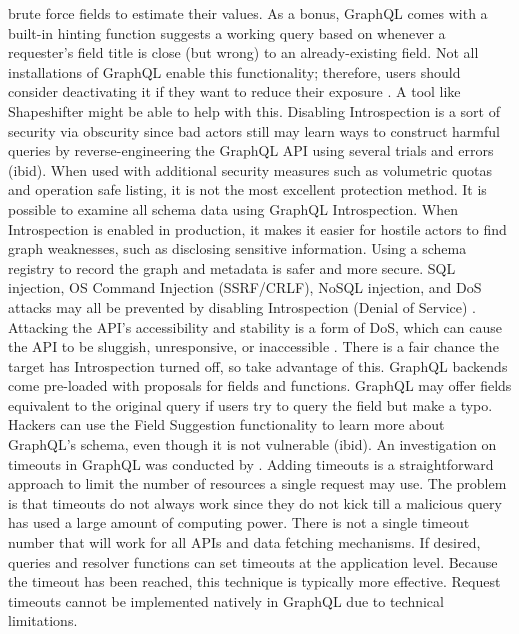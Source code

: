 brute force fields to estimate their values. As a bonus, GraphQL comes with a
built-in hinting function suggests a working query based on whenever a
requester's field title is close (but wrong) to an already-existing field. Not
all installations of GraphQL enable this functionality; therefore, users should
consider deactivating it if they want to reduce their exposure
\citep{kouraiSecureOffloadingLegacy2016}. A tool like Shapeshifter might be able
to help with this. Disabling Introspection is a sort of security via obscurity
since bad actors still may learn ways to construct harmful queries by
reverse-engineering the GraphQL API using several trials and errors (ibid). When
used with additional security measures such as volumetric quotas and operation
safe listing, it is not the most excellent protection method. It is possible to
examine all schema data using GraphQL Introspection. When Introspection is
enabled in production, it makes it easier for hostile actors to find graph
weaknesses, such as disclosing sensitive information. Using a schema registry to
record the graph and metadata is safer and more secure. SQL injection, OS
Command Injection (SSRF/CRLF), NoSQL injection, and DoS attacks may all be
prevented by disabling Introspection (Denial of Service) \citep{
eizingerAPIDesignDistributed2017}. Attacking the API's accessibility and
stability is a form of DoS, which can cause the API to be sluggish, unresponsive,
or inaccessible \citep{gozneliIdentificationEvaluationProcess2020}. There is a
fair chance the target has Introspection turned off, so take advantage of this.
GraphQL backends come pre-loaded with proposals for fields and functions.
GraphQL may offer fields equivalent to the original query if users try to query
the field but make a typo. Hackers can use the Field Suggestion functionality to
learn more about GraphQL's schema, even though it is not vulnerable (ibid). An
investigation on timeouts in GraphQL was conducted by \citet{
witternEmpiricalStudyGraphQL2019}. Adding timeouts is a straightforward approach
to limit the number of resources a single request may use. The problem is that
timeouts do not always work since they do not kick till a malicious query has
used a large amount of computing power. There is not a single timeout number
that will work for all APIs and data fetching mechanisms. If desired, queries
and resolver functions can set timeouts at the application level. Because the
timeout has been reached, this technique is typically more effective. Request
timeouts cannot be implemented natively in GraphQL due to technical limitations.
